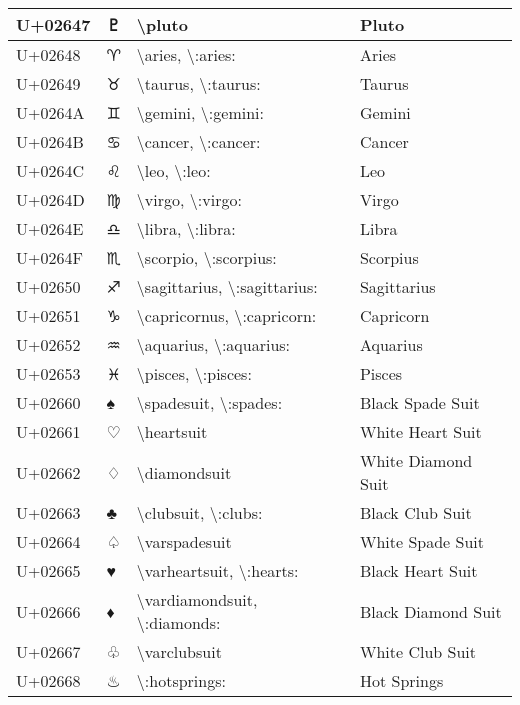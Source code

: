 \begin{table}[h]
\begin{tabulary}{\linewidth}{|L|L|L|L|}
\hline
U+02647 & ♇ & {\textbackslash}pluto & Pluto \\
\hline
U+02648 & ♈ & {\textbackslash}aries, {\textbackslash}:aries: & Aries \\
\hline
U+02649 & ♉ & {\textbackslash}taurus, {\textbackslash}:taurus: & Taurus \\
\hline
U+0264A & ♊ & {\textbackslash}gemini, {\textbackslash}:gemini: & Gemini \\
\hline
U+0264B & ♋ & {\textbackslash}cancer, {\textbackslash}:cancer: & Cancer \\
\hline
U+0264C & ♌ & {\textbackslash}leo, {\textbackslash}:leo: & Leo \\
\hline
U+0264D & ♍ & {\textbackslash}virgo, {\textbackslash}:virgo: & Virgo \\
\hline
U+0264E & ♎ & {\textbackslash}libra, {\textbackslash}:libra: & Libra \\
\hline
U+0264F & ♏ & {\textbackslash}scorpio, {\textbackslash}:scorpius: & Scorpius \\
\hline
U+02650 & ♐ & {\textbackslash}sagittarius, {\textbackslash}:sagittarius: & Sagittarius \\
\hline
U+02651 & ♑ & {\textbackslash}capricornus, {\textbackslash}:capricorn: & Capricorn \\
\hline
U+02652 & ♒ & {\textbackslash}aquarius, {\textbackslash}:aquarius: & Aquarius \\
\hline
U+02653 & ♓ & {\textbackslash}pisces, {\textbackslash}:pisces: & Pisces \\
\hline
U+02660 & ♠ & {\textbackslash}spadesuit, {\textbackslash}:spades: & Black Spade Suit \\
\hline
U+02661 & ♡ & {\textbackslash}heartsuit & White Heart Suit \\
\hline
U+02662 & ♢ & {\textbackslash}diamondsuit & White Diamond Suit \\
\hline
U+02663 & ♣ & {\textbackslash}clubsuit, {\textbackslash}:clubs: & Black Club Suit \\
\hline
U+02664 & ♤ & {\textbackslash}varspadesuit & White Spade Suit \\
\hline
U+02665 & ♥ & {\textbackslash}varheartsuit, {\textbackslash}:hearts: & Black Heart Suit \\
\hline
U+02666 & ♦ & {\textbackslash}vardiamondsuit, {\textbackslash}:diamonds: & Black Diamond Suit \\
\hline
U+02667 & ♧ & {\textbackslash}varclubsuit & White Club Suit \\
\hline
U+02668 & ♨ & {\textbackslash}:hotsprings: & Hot Springs \\

\end{tabulary}
\end{table}
